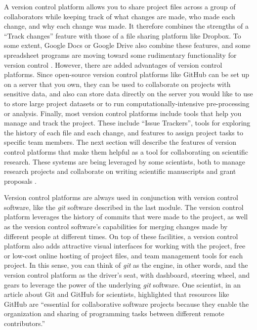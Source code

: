 \documentclass[]{tufte-book}
\begin{document}
A version control platform allows you to share project files across a group of
collaborators while keeping track of what changes are made, who made each
change, and why each change was made. It therefore combines the strengths of a
``Track changes'' feature with those of a file sharing platform like Dropbox. To
some extent, Google Docs or Google Drive also combine these features, and some
spreadsheet programs are moving toward some rudimentary functionality for
version control \citep{birch2018future}. However, there are added advantages of
version control platforms. Since open-source version control platforms like
GitHub can be set up on a server that you own, they can be used to collaborate
on projects with sensitive data, and also can store data directly on the server
you would like to use to store large project datasets or to run
computationally-intensive pre-processing or analysis. Finally, most version
control platforms include tools that help you manage and track the project.
These include ``Issue Trackers'', tools for exploring the history of each file
and each change, and features to assign project tasks to specific team members.
The next section will describe the features of version control platforms that
make them helpful as a tool for collaborating on scientific research. These
systems are being leveraged by some scientists, both to manage research projects
and collaborate on writing scientific manuscripts and grant proposals
\citep{perez2016ten}.

Version control platforms are always used in conjunction with version control
software, like the \emph{git} software described in the last module. The version
control platform leverages the history of commits that were made to the project,
as well as the version control software's capabilities for merging changes made
by different people at different times. On top of these facilities, a version
control platform also adds attractive visual interfaces for working with the
project, free or low-cost online hosting of project files, and team management
tools for each project. In this sense, you can think of \emph{git} as the engine, in
other words, and the version control platform as the driver's seat, with
dashboard, steering wheel, and gears to leverage the power of the underlying
\emph{git} software. One scientist, in an article about Git and GitHub for
scientists, highlighted that resources like GitHub are ``essential for
collaborative software projects because they enable the organization and sharing
of programming tasks between different remote contributors.'' \citep{perez2016ten}
\end{document}
